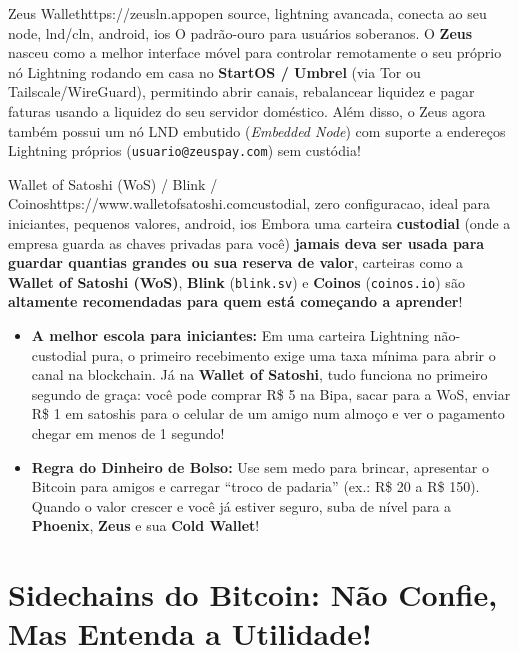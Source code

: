 \documentclass{pousadaguide}
\begin{document}
\begin{ferramenta}[goat,logo=zeus]{Zeus Wallet}{https://zeusln.app}{open source, lightning avancada, conecta ao seu node, lnd/cln, android, ios}
O padrão-ouro para usuários soberanos. O \textbf{Zeus} nasceu como a melhor interface móvel para controlar remotamente o seu próprio nó Lightning rodando em casa no \textbf{StartOS / Umbrel} (via Tor ou Tailscale/WireGuard), permitindo abrir canais, rebalancear liquidez e pagar faturas usando a liquidez do seu servidor doméstico. Além disso, o Zeus agora também possui um nó LND embutido (\emph{Embedded Node}) com suporte a endereços Lightning próprios (\texttt{usuario@zeuspay.com}) sem custódia! 
\end{ferramenta}

\begin{ferramenta}[logo=wos]{Wallet of Satoshi (WoS) / Blink / Coinos}{https://www.walletofsatoshi.com}{custodial, zero configuracao, ideal para iniciantes, pequenos valores, android, ios}
Embora uma carteira \textbf{custodial} (onde a empresa guarda as chaves privadas para você) \textbf{jamais deva ser usada para guardar quantias grandes ou sua reserva de valor}, carteiras como a \textbf{Wallet of Satoshi (WoS)}, \textbf{Blink} (\texttt{blink.sv}) e \textbf{Coinos} (\texttt{coinos.io}) são \textbf{altamente recomendadas para quem está começando a aprender}!
\begin{itemize}
  \item \textbf{A melhor escola para iniciantes:} Em uma carteira Lightning não-custodial pura, o primeiro recebimento exige uma taxa mínima para abrir o canal na blockchain. Já na \textbf{Wallet of Satoshi}, tudo funciona no primeiro segundo de graça: você pode comprar R\$ 5 na Bipa, sacar para a WoS, enviar R\$ 1 em satoshis para o celular de um amigo num almoço e ver o pagamento chegar em menos de 1 segundo!
  \item \textbf{Regra do Dinheiro de Bolso:} Use sem medo para brincar, apresentar o Bitcoin para amigos e carregar ``troco de padaria'' (ex.: R\$ 20 a R\$ 150). Quando o valor crescer e você já estiver seguro, suba de nível para a \textbf{Phoenix}, \textbf{Zeus} e sua \textbf{Cold Wallet}!
\end{itemize}
\end{ferramenta}

\section{Sidechains do Bitcoin: Não Confie, Mas Entenda a Utilidade!}
\end{document}
